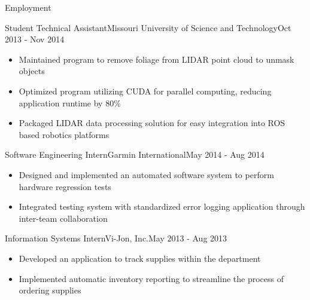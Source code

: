 \documentclass[]{mcdowellcv}
\begin{document}
\begin{cvsection}{Employment}
\begin{rockmech}
    \begin{cvsubsection}[2]{Student Technical Assistant}{Missouri University of Science and Technology}{Oct 2013 - Nov 2014}        
        \begin{itemize}
            \item Maintained program to remove foliage from LIDAR point cloud to unmask objects
            \item Optimized program utilizing CUDA for parallel computing, reducing application runtime by 80\%
            \item Packaged LIDAR data processing solution for easy integration into ROS based robotics platforms
        \end{itemize}
    \end{cvsubsection}
\end{rockmech}
    
\begin{garmin}
    \begin{cvsubsection}{Software Engineering Intern}{Garmin International}{May 2014 - Aug 2014}   
        \begin{itemize}
            \item Designed and implemented an automated software system to perform hardware regression tests
            \item Integrated testing system with standardized error logging application through inter-team collaboration
        \end{itemize}
    \end{cvsubsection}
\end{garmin}

\begin{vijon}
    \begin{cvsubsection}{Information Systems Intern}{Vi-Jon, Inc.}{May 2013 - Aug 2013}
        \begin{itemize}
            \item Developed an application to track supplies within the department
            \item Implemented automatic inventory reporting to streamline the process of ordering supplies
        \end{itemize}
    \end{cvsubsection}
\end{vijon}

\end{cvsection}
\end{document}
